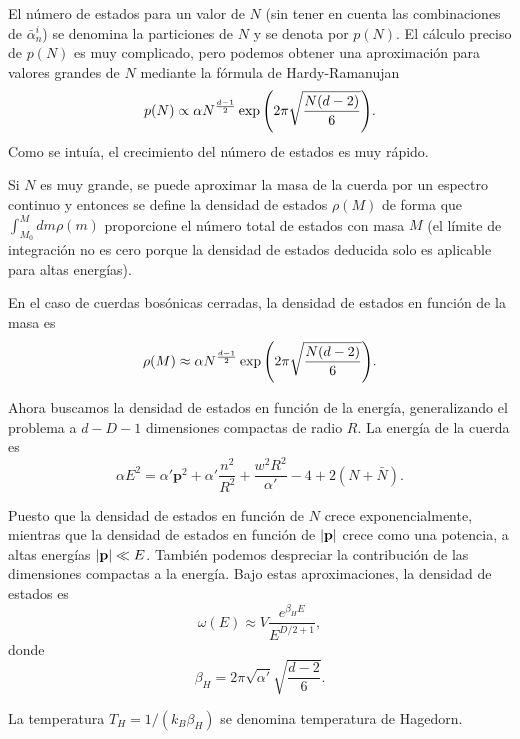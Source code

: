 El número de estados para un valor de $N$ (sin tener en cuenta las combinaciones de $\bar \alpha^i_n$) se denomina la particiones de $N$ 
y se denota por $p(N)$.
El cálculo preciso de $p(N)$ es muy complicado, pero podemos obtener una aproximación para
valores grandes de $N$ mediante la fórmula de Hardy-Ramanujan
\begin{equation}
  p(N)\propto \alpha N^ {\frac{d-1}{2}}\exp\qty(2\pi\sqrt{\frac{N(d-2)}{6}}).
\end{equation}
Como se intuía, el crecimiento del número de estados es muy rápido.

Si $N$ es muy grande, se puede aproximar la masa de la cuerda por un espectro continuo y entonces se define la
densidad de estados $\rho(M)$ de forma que $\int_{M_0}^M dm \rho(m)$ proporcione el número total
de estados con masa $M$ (el límite de integración no es cero porque la densidad de estados deducida
solo es aplicable para altas energías).

En el caso de cuerdas bosónicas cerradas, la densidad de estados en función de la masa es
\begin{equation}
  \rho(M)\approx \alpha N^ {\frac{d-1}{2}}\exp\qty(2\pi\sqrt{\frac{N(d-2)}{6}}).
\end{equation}

Ahora buscamos la densidad de estados en función de la energía, generalizando el problema a $d-D-1$ dimensiones compactas 
de radio $R$.
La energía de la cuerda es
\begin{equation}
  \alpha E^2 = \alpha' \mathbf p ^2 + \alpha'\frac{n^2}{R^2} + \frac{w^2 R^2}{\alpha'} -4+ 2(N+\bar N).
\end{equation}

Puesto que la densidad de estados en función de $N$ crece exponencialmente, mientras 
que la densidad de estados en función de $\abs{\mathbf p}$ crece como una potencia,
a altas energías $\abs{\mathbf p} \ll E$.
También podemos despreciar la contribución de las dimensiones compactas a la energía.
Bajo estas aproximaciones, la densidad de estados es
\begin{equation}
  \omega(E) \approx V \frac{e^{\beta_H E}}{E^{D/2+1}},
\end{equation}
donde 
\begin{equation}
  \beta_H = 2\pi \sqrt{\alpha'}\sqrt{\frac{d-2}{6}}.
\end{equation}

La temperatura $T_H=1/(k_B \beta_H)$ se denomina temperatura de Hagedorn.

